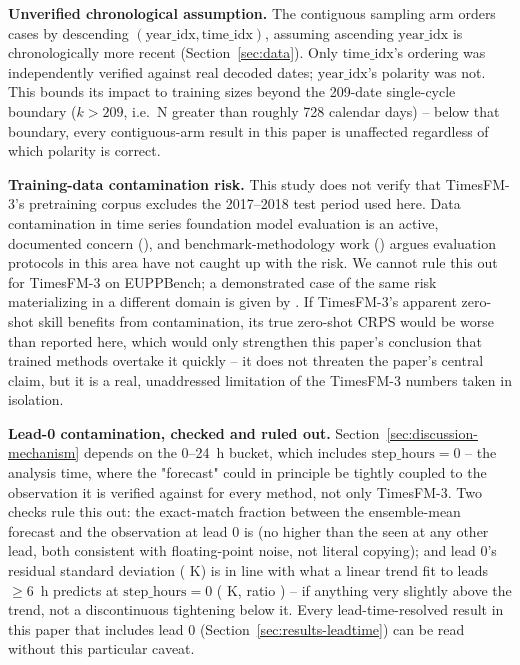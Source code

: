 \textbf{Unverified chronological assumption.} The contiguous sampling
arm orders cases by descending \((\mathrm{year\_idx}, \mathrm{time\_idx})\),
assuming ascending \(\mathrm{year\_idx}\) is chronologically more recent
(Section~\ref{sec:data}). Only \(\mathrm{time\_idx}\)'s ordering was
independently verified against real decoded dates; \(\mathrm{year\_idx}\)'s
polarity was not. This bounds its impact to training sizes beyond the
209-date single-cycle boundary (\(k>209\), i.e.\ N greater than roughly
728 calendar days) -- below that boundary, every contiguous-arm result in
this paper is unaffected regardless of which polarity is correct.

\textbf{Training-data contamination risk.} This study does not verify that
TimesFM-3's pretraining corpus excludes the 2017--2018 test period used
here. Data contamination in time series foundation model evaluation is an
active, documented concern
(\citealp{li_2026_tsfmaudit,chiazagomekpere_2026_leakage_aware,balloccu_2024_leak_cheat_repeat}),
and benchmark-methodology work
(\citealp{aksu_2024_gift_eval,meyer_2025_rethinking_eval}) argues evaluation
protocols in this area have not caught up with the risk. We cannot rule
this out for TimesFM-3 on EUPPBench; a demonstrated case of the same risk
materializing in a different domain is given by
\citet{pan_2026_contamination_electricity}. If TimesFM-3's apparent
zero-shot skill benefits from contamination, its true zero-shot CRPS would
be worse than reported here, which would only strengthen this paper's
conclusion that trained methods overtake it quickly -- it does not
threaten the paper's central claim, but it is a real, unaddressed
limitation of the TimesFM-3 numbers taken in isolation.

\textbf{Lead-0 contamination, checked and ruled out.}
Section~\ref{sec:discussion-mechanism} depends on the 0--24~h bucket,
which includes \(\mathrm{step\_hours}=0\) -- the analysis time, where the
"forecast" could in principle be tightly coupled to the observation it
is verified against for every method, not only TimesFM-3. Two checks
rule this out: the exact-match fraction between the ensemble-mean
forecast and the observation at lead 0 is \LeadZeroExactMatchFraction{}
(no higher than the \LeadZeroMaxOtherExactMatchFraction{} seen at any other
lead, both consistent with floating-point noise, not literal copying);
and lead 0's residual standard deviation (\LeadZeroActualStd{} K) is in
line with what a linear trend fit to leads \(\geq 6\)~h predicts at
\(\mathrm{step\_hours}=0\) (\LeadZeroPredictedStd{} K, ratio
\LeadZeroStdRatio{}) -- if anything very slightly above the trend, not a
discontinuous tightening below it. Every lead-time-resolved result in
this paper that includes lead 0 (Section~\ref{sec:results-leadtime}) can
be read without this particular caveat.
